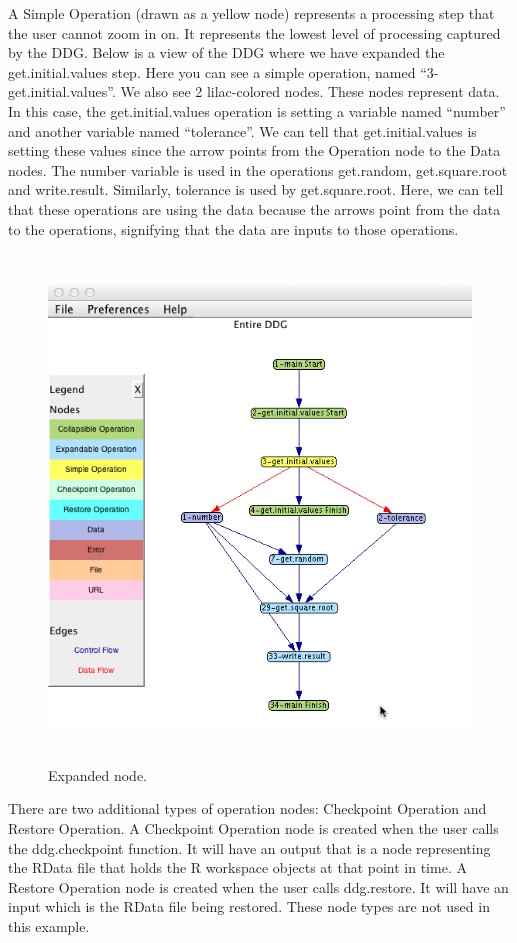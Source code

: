 \documentclass[12pt]{article}
\begin{document}
{{\mdseries\upshape\color{black}
A Simple Operation (drawn as a yellow node) represents a processing step that the user cannot zoom in on. It represents the lowest level of processing captured by the DDG. Below is a view of the DDG where we have expanded the get.initial.values step. Here you can see a simple operation, named “3-get.initial.values”. We also see 2 lilac-colored nodes. These nodes represent data. In this case, the get.initial.values operation is setting a variable named “number” and another variable named “tolerance”. We can tell that get.initial.values is setting these values since the arrow points from the Operation node to the Data nodes. The number variable is used in the operations get.random, get.square.root and write.result. Similarly, tolerance is used by get.square.root. Here, we can tell that these operations are using the data because the arrows point from the data to the operations, signifying that the data are inputs to those operations.}
\begin{figure}[h!]
\centering
  \caption{Expanded node.}
 \includegraphics[width=4.9654in,height=5.2917in]{UsingDDGExplorer-img/UsingDDGExplorer-img004.png} 
\end{figure}
{\mdseries\upshape\color{black}
There are two additional types of operation nodes: Checkpoint Operation and Restore Operation. A Checkpoint Operation node is created when the user calls the ddg.checkpoint function. It will have an output that is a node representing the RData file that holds the R workspace objects at that point in time. A Restore Operation node is created when the user calls ddg.restore. It will have an input which is the RData file being restored. These node types are not used in this example.}

}
\end{document}
